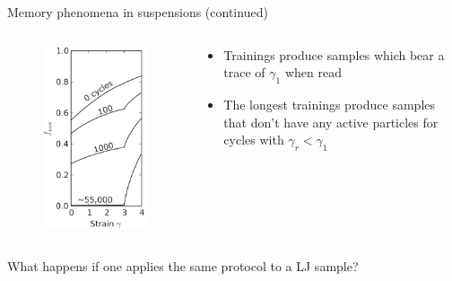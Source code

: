 \documentclass[compress]{beamer}
\begin{document}
	\begin{frame}{Memory phenomena in suspensions (continued)}

		\begin{columns}[c]
			
			\begin{column}{0.3\textwidth}
				\centering
				\begin{figure}
					\includegraphics[height=0.6\textheight]{Graphics/Literature/SuspensionSingleMemory}
				\end{figure}
			\end{column}

			\begin{column}{0.7\textwidth}
				
				\begin{itemize}
					\item<1-> Trainings produce samples which bear a trace of $\gamma_{1}$ when read
					\item<2-> The longest trainings produce samples that don't have any active particles for cycles with $\gamma_{r} < \gamma_{1}$
				\end{itemize}

			\end{column}

		\end{columns}

		\vspace{0.5cm}
		What happens if one applies the same protocol to a LJ sample?
				
	\end{frame}
\end{document}
